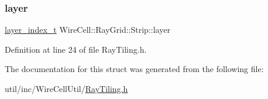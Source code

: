 \subsubsection{\texorpdfstring{layer}{layer}}
{\footnotesize\ttfamily \hyperlink{namespace_wire_cell_1_1_ray_grid_ab7562e54b58eede813d5b70b5eb85812}{layer\+\_\+index\+\_\+t} Wire\+Cell\+::\+Ray\+Grid\+::\+Strip\+::layer}



Definition at line 24 of file Ray\+Tiling.\+h.



The documentation for this struct was generated from the following file\+:\begin{DoxyCompactItemize}
\item 
util/inc/\+Wire\+Cell\+Util/\hyperlink{_ray_tiling_8h}{Ray\+Tiling.\+h}\end{DoxyCompactItemize}
